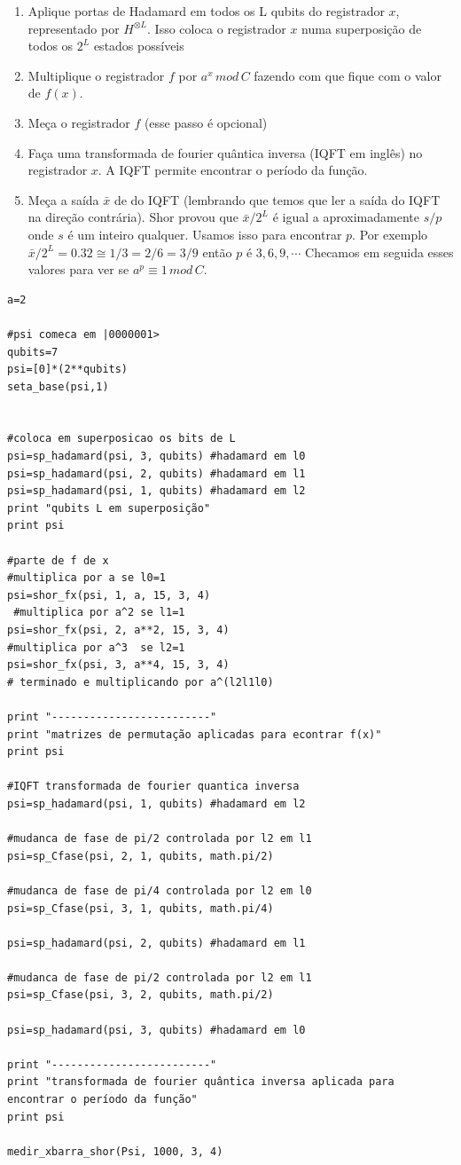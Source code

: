 \documentclass[12pt,a4paper]{article}
\begin{document}
\begin{enumerate}
\item Aplique portas de Hadamard em todos os L qubits do registrador $x$, representado por $H^{\otimes L}$. Isso coloca o registrador $x$ numa superposição de todos os $2^{L}$ estados possíveis

\item Multiplique o registrador $f$ por $a^{x} \, mod \, C$ fazendo com que fique com o valor de $f(x)$.

\item Meça o registrador $f$ (esse passo é opcional)

\item Faça uma transformada de fourier quântica inversa (IQFT em inglês) no registrador $x$. A IQFT permite encontrar o período da função.

\item Meça a saída $\bar{x}$ de do IQFT (lembrando que temos que ler a saída do IQFT na direção contrária).  Shor provou que $\bar{x}/2^{L}$ é igual a aproximadamente $s/p$ onde $s$ é um inteiro qualquer. Usamos isso para encontrar $p$. Por exemplo $\bar{x}/2^{L} = 0.32 \cong 1/3 = 2/6 = 3/9$ então $p$ é $3, 6, 9, \cdots$ Checamos em seguida esses valores para ver se $a^{p} \equiv 1\, mod\, C$.

\end{enumerate}


\begin{verbatim}
a=2

#psi comeca em |0000001>
qubits=7
psi=[0]*(2**qubits)
seta_base(psi,1)


#coloca em superposicao os bits de L
psi=sp_hadamard(psi, 3, qubits) #hadamard em l0 
psi=sp_hadamard(psi, 2, qubits) #hadamard em l1 
psi=sp_hadamard(psi, 1, qubits) #hadamard em l2 
print "qubits L em superposição"
print psi

#parte de f de x
#multiplica por a se l0=1
psi=shor_fx(psi, 1, a, 15, 3, 4) 
 #multiplica por a^2 se l1=1
psi=shor_fx(psi, 2, a**2, 15, 3, 4)
#multiplica por a^3  se l2=1
psi=shor_fx(psi, 3, a**4, 15, 3, 4) 
# terminado e multiplicando por a^(l2l1l0)

print "-------------------------"
print "matrizes de permutação aplicadas para econtrar f(x)"
print psi

#IQFT transformada de fourier quantica inversa
psi=sp_hadamard(psi, 1, qubits) #hadamard em l2

#mudanca de fase de pi/2 controlada por l2 em l1
psi=sp_Cfase(psi, 2, 1, qubits, math.pi/2) 

#mudanca de fase de pi/4 controlada por l2 em l0
psi=sp_Cfase(psi, 3, 1, qubits, math.pi/4) 

psi=sp_hadamard(psi, 2, qubits) #hadamard em l1

#mudanca de fase de pi/2 controlada por l2 em l1
psi=sp_Cfase(psi, 3, 2, qubits, math.pi/2) 

psi=sp_hadamard(psi, 3, qubits) #hadamard em l0 

print "-------------------------"
print "transformada de fourier quântica inversa aplicada para encontrar o período da função"
print psi

medir_xbarra_shor(Psi, 1000, 3, 4)
\end{verbatim}
\end{document}
